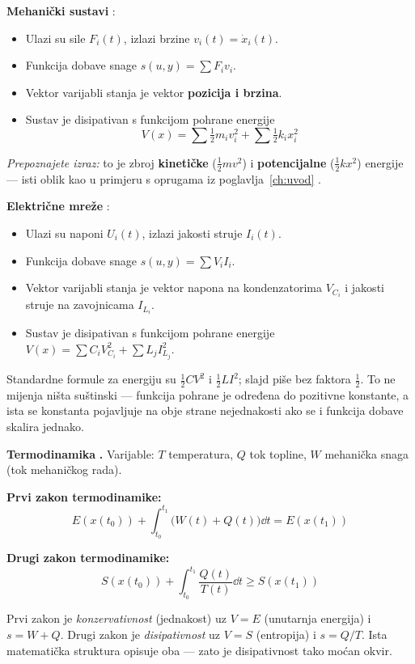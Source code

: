 \textbf{Mehanički sustavi} :
\begin{itemize}
  \item Ulazi su sile $F_i(t)$, izlazi brzine $v_i(t) = \dot x_i(t)$.
  \item Funkcija dobave snage $s(u,y) = \sum F_iv_i$.
  \item Vektor varijabli stanja je vektor \textbf{pozicija i brzina}.
  \item Sustav je disipativan s funkcijom pohrane energije
        \[
        V(x) = \sum \tfrac12 m_iv_i^2 + \sum \tfrac12 k_ix_i^2
        \]
\end{itemize}

\emph{Prepoznajete izraz:} to je zbroj \textbf{kinetičke} ($\tfrac12mv^2$) i
\textbf{potencijalne} ($\tfrac12kx^2$) energije --- isti oblik kao u primjeru s
oprugama iz poglavlja~\ref{ch:uvod} .

\textbf{Električne mreže} :
\begin{itemize}
  \item Ulazi su naponi $U_i(t)$, izlazi jakosti struje $I_i(t)$.
  \item Funkcija dobave snage $s(u,y) = \sum V_iI_i$.
  \item Vektor varijabli stanja je vektor napona na kondenzatorima $V_{C_i}$ i
        jakosti struje na zavojnicama $I_{L_i}$.
  \item Sustav je disipativan s funkcijom pohrane energije
        $V(x) = \sum C_iV_{C_i}^2 + \sum L_jI_{L_j}^2$.
\end{itemize}

\begin{napomena}
Standardne formule za energiju su $\tfrac12CV^2$ i $\tfrac12LI^2$; slajd piše
bez faktora $\tfrac12$. To ne mijenja ništa suštinski --- funkcija pohrane je
određena do pozitivne konstante, a ista se konstanta pojavljuje na obje strane
nejednakosti ako se i funkcija dobave skalira jednako.
\end{napomena}

\textbf{Termodinamika} \textbf{.} Varijable: $T$ temperatura, $Q$ tok
topline, $W$ mehanička snaga (tok mehaničkog rada).

\textbf{Prvi zakon termodinamike:}
\[
E(x(t_0)) + \int_{t_0}^{t_1}\big(W(t) + Q(t)\big)\dd t = E(x(t_1))
\]

\textbf{Drugi zakon termodinamike:}
\[
S(x(t_0)) + \int_{t_0}^{t_1}\frac{Q(t)}{T(t)}\dd t \ge S(x(t_1))
\]

\begin{napomena}
Prvi zakon je \emph{konzervativnost} (jednakost) uz $V = E$ (unutarnja
energija) i $s = W + Q$. Drugi zakon je \emph{disipativnost} uz $V = S$
(entropija) i $s = Q/T$. Ista matematička struktura opisuje oba --- zato je
disipativnost tako moćan okvir.
\end{napomena}

